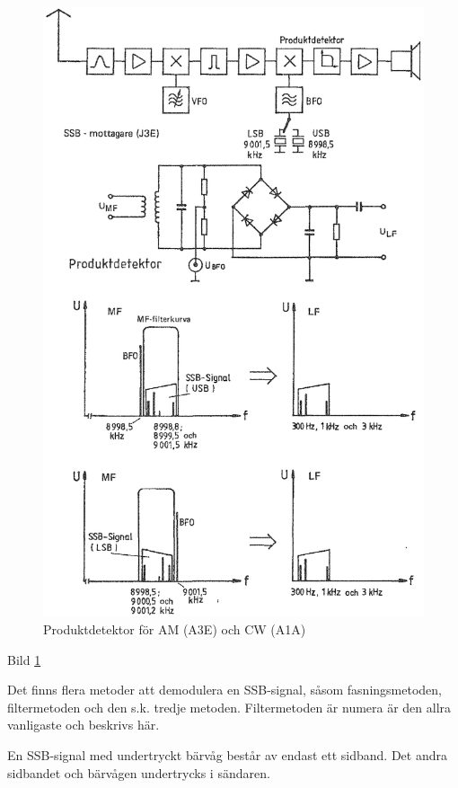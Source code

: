 \begin{figure}
\includegraphics[width=\textwidth]{images/cropped_pdfs/bild_2_3-56.pdf}
\caption{Produktdetektor för AM (A3E) och CW (A1A)}
\label{fig:BildII3-56}
\end{figure}

Bild \ref{fig:BildII3-56}

Det finns flera metoder att demodulera en SSB-signal, såsom
fasningsmetoden, filtermetoden och den s.k. tredje
metoden. Filtermetoden är numera är den allra vanligaste och beskrivs
här.

En SSB-signal med undertryckt bärvåg består av endast ett sidband. Det
andra sidbandet och bärvågen undertrycks i sändaren.

